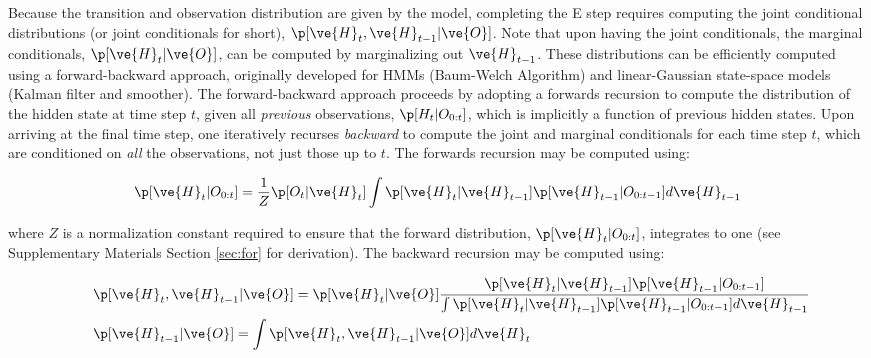 \noindent Because the transition and observation distribution are given by the model, completing the E step requires computing the joint conditional distributions (or joint conditionals for short), $\p [\ve{H}_t,\ve{H}_{t-1} | \ve{O}]$.  Note that upon having the joint conditionals, the marginal conditionals, $\p [\ve{H}_t |  \ve{O}]$, can be computed by marginalizing out $\ve{H}_{t-1}$.  These distributions can be efficiently computed using a forward-backward approach, originally developed for HMMs (Baum-Welch Algorithm\cite{BaumWeiss70}) and linear-Gaussian state-space models (Kalman filter and smoother\cite{Kalman60}).  The forward-backward approach proceeds by adopting a forwards recursion to compute the distribution of the hidden state at time step $t$, given all \emph{previous} observations, $\p[H_t | O_{0:t}]$, which is implicitly a function of previous hidden states.  Upon arriving at the final time step, one iteratively recurses \emph{backward} to compute the joint and marginal conditionals for each time step $t$, which are conditioned on \emph{all} the observations, not just those up to $t$.  The forwards recursion may be computed using:


\begin{align}\label{eq:for}
\p[\ve{H}_t|O_{0:t}] = \frac{1}{Z} \p[O_t|\ve{H}_t] %
\int \p[\ve{H}_t|\ve{H}_{t-1}] \p[\ve{H}_{t-1} | O_{0:t-1}] d\ve{H}_{t-1}
\end{align} %

\noindent where $Z$ is a normalization constant required to ensure that the forward distribution, $\p[\ve{H}_t|O_{0:t}]$, integrates to one (see Supplementary Materials Section \ref{sec:for} for derivation). The backward recursion may be computed using:

\begin{subequations} \label{eq:back0}
\begin{align} \label{eq:joint}
&\qquad \p[\ve{H}_t, \ve{H}_{t-1} | \ve{O}] = %
\p [\ve{H}_t | \ve{O}] \frac{\p [\ve{H}_t | \ve{H}_{t-1}] \p [\ve{H}_{t-1} | O_{0:t-1}]}{\int \p [\ve{H}_t | \ve{H}_{t-1}] \p [\ve{H}_{t-1} | O_{0:t-1}] d\ve{H}_{t-1} }
\\ \label{eq:marg} &\qquad \p[\ve{H}_{t-1} | \ve{O}] =  \int \p[\ve{H}_t, \ve{H}_{t-1} | \ve{O}] d\ve{H}_t
\end{align}
\end{subequations}

